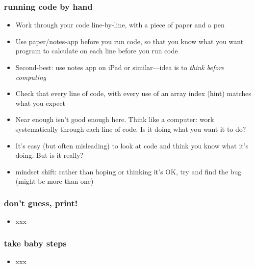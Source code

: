 \documentclass[14pt]{beamer}
\begin{document}
\begin{frame}[fragile]

\frametitle{running code by hand}

\begin{itemize}
	\item Work through your code line-by-line, with a piece of paper and a pen
	\item Use paper/notes-app before you run code, so that you know what you want program to calculate on each line before you run code
	\item Second-best: use notes app on iPad or similar---idea is to \emph{think before computing}
	\item Check that every line of code, with every use of an array index (hint) matches what you expect
	\item Near enough isn't good enough here. Think like a computer: work systematically through each line of code. Is it doing what you want it to do?
	\item It's easy (but often misleading) to look at code and think you know what it's doing. But is it really?
	\item mindset shift: rather than hoping or thinking it's OK, try and find the bug (might be more than one)
\end{itemize}

\end{frame}


\begin{frame}[fragile]

\frametitle{don't guess, print!}

\begin{itemize}
	\item xxx
\end{itemize}

\end{frame}


\begin{frame}[fragile]

\frametitle{take baby steps}

\begin{itemize}
	\item xxx
\end{itemize}

\end{frame}
\end{document}
